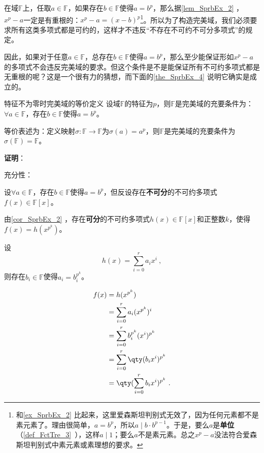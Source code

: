 在域$\mathbb{F}$上，任取$a\in\mathbb{F}$，如果存在$b\in\mathbb{F}$使得$a=b^p$，那么据\autoref{lem_SprbEx_2} ，$x^p-a$一定是有重根的：$x^p-a=(x-b)^p$\footnote{和\autoref{ex_SprbEx_2} 比起来，这里爱森斯坦判别式无效了，因为任何元素都不是素元素了。理由很简单，$a=b^p$，所以$a\mid b\cdot b^{p-1}$。于是，要么$a$是\textbf{单位}（\autoref{def_FctTre_3}~），这样$a\mid 1$；要么$a$不是素元素。总之$x^p-a$没法符合爱森斯坦判别式中素元素或素理想的要求。}。所以为了构造完美域，我们必须要求所有这类多项式都是可约的，这样才不违反“不存在不可约不可分多项式”的规定。

因此，如果对于任意$a\in\mathbb{F}$，总存在$b\in\mathbb{F}$使得$a=b^p$，那么至少能保证形如$x^p-a$的多项式不会违反完美域的要求。但这个条件是不是能保证所有不可约多项式都是无重根的呢？这是一个很有力的猜想，而下面的\autoref{the_SprbEx_4} 说明它确实是成立的。





\begin{theorem}{特征不为零时完美域的等价定义}\label{the_SprbEx_4}
设域$\mathbb{F}$的特征为$p$，则$\mathbb{F}$是完美域的充要条件为：$\forall a\in\mathbb{F}$，存在$b\in\mathbb{F}$使得$a=b^p$。

等价表述为：定义映射$\sigma:\mathbb{F}\to\mathbb{F}$为$\sigma(a)=a^p$，则$\mathbb{F}$是完美域的充要条件为$\sigma(\mathbb{F})=\mathbb{F}$。
\end{theorem}

\textbf{证明}：

充分性：

设$\forall a\in\mathbb{F}$，存在$b\in\mathbb{F}$使得$a=b^p$，但反设存在\textbf{不可分}的不可约多项式$f(x)\in\mathbb{F}[x]$。

由\autoref{cor_SprbEx_2} ，存在\textbf{可分}的不可约多项式$h(x)\in\mathbb{F}[x]$和正整数$k$，使得$f(x)=h(x^{p^k})$。

设
\begin{equation}
h(x) = \sum_{i=0}^r a_ix^i~,
\end{equation}
则存在$b_i\in\mathbb{F}$使得$a_i=b_i^{p^k}$。

\begin{equation}\label{eq_SprbEx_1}
\begin{aligned}
f(x)&=h(x^{p^k}) \\
&=\sum_{i=0}^r a_i(x^{p^k})^i\\
&=\sum_{i=0}^r b_i^{p^k}(x^{i})^{p^k}\\
&=\sum_{i=0}^r \qty(b_ix^i)^{p^k}\\
&=\qty(\sum_{i=0}^r b_ix^i)^{p^k}~.
\end{aligned}
\end{equation}

